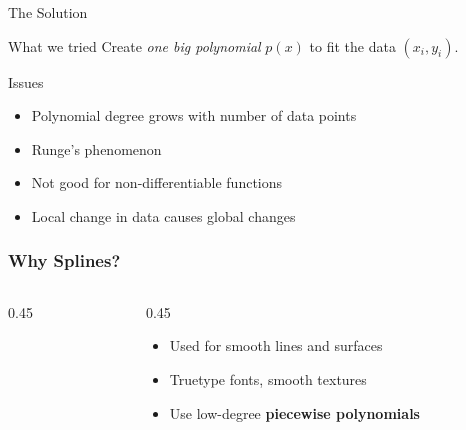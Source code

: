 \documentclass[10pt]{beamer}
\begin{document}

\begin{frame}{The Solution}

\begin{block}{What we tried}
    Create \emph{one big polynomial} $p(x)$ to fit the data $(x_i,y_i)$.
\end{block}

\begin{block}{Issues}
    \begin{itemize}
        \item Polynomial degree grows with number of data points
        \item Runge's phenomenon 
        \item Not good for non-differentiable functions 
        \item Local change in data causes global changes
    \end{itemize}
\end{block}
\vspace{3mm}




\end{frame}

\begin{frame}
\frametitle{Why Splines?}
\begin{columns}
\begin{column}{0.45\textwidth}
\begin{center}
\end{center}
\begin{center}
\end{center}
\begin{center}
\end{center}
\end{column}
\begin{column}{0.45\textwidth}
\begin{itemize}
  \item Used for smooth lines and surfaces\\[3mm]
  \vfill 
  \item Truetype fonts, smooth textures\\[3mm]
  \vfill 
  \item Use low-degree \textbf{piecewise polynomials}\\[3mm]
  \vfill 
\end{itemize}
\end{column}
\end{columns}
\end{frame}
\end{document}
